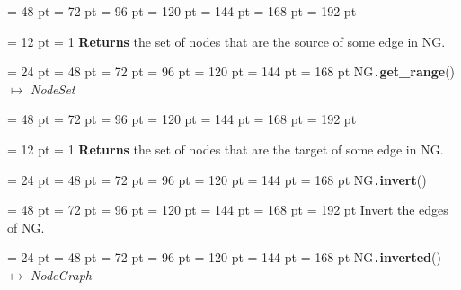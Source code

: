 {{{{\par \noindent  \leftskip = 48 pt  \leftmargini = 72 pt  \leftmarginii = 96 pt  \leftmarginiii = 120 pt  \leftmarginiv = 144 pt  \leftmarginv = 168 pt  \leftmarginvi = 192 pt {\par \noindent
{\par \pagebreak[3.100000] \noindent \hangindent = 12 pt \hangafter = 1 
{\bf Returns \/} the set of nodes that are the source of some edge in NG.
\par}
\par}
\par}
\par}
\par}
{\par \noindent  \leftskip = 24 pt  \leftmargini = 48 pt  \leftmarginii = 72 pt  \leftmarginiii = 96 pt  \leftmarginiv = 120 pt  \leftmarginv = 144 pt  \leftmarginvi = 168 pt NG{\tt .\/}{\bf {\large {\bf get{\_}range\/}}\/}() \(\mapsto \)  {\em NodeSet\/}{\par \noindent
{\par \noindent  \leftskip = 48 pt  \leftmargini = 72 pt  \leftmarginii = 96 pt  \leftmarginiii = 120 pt  \leftmarginiv = 144 pt  \leftmarginv = 168 pt  \leftmarginvi = 192 pt {\par \noindent
{\par \pagebreak[3.100000] \noindent \hangindent = 12 pt \hangafter = 1 
{\bf Returns \/} the set of nodes that are the target of some edge in NG.
\par}
\par}
\par}
\par}
\par}
{\par \noindent  \leftskip = 24 pt  \leftmargini = 48 pt  \leftmarginii = 72 pt  \leftmarginiii = 96 pt  \leftmarginiv = 120 pt  \leftmarginv = 144 pt  \leftmarginvi = 168 pt NG{\tt .\/}{\bf {\large {\bf invert\/}}\/}(){\par \noindent
{\par \noindent  \leftskip = 48 pt  \leftmargini = 72 pt  \leftmarginii = 96 pt  \leftmarginiii = 120 pt  \leftmarginiv = 144 pt  \leftmarginv = 168 pt  \leftmarginvi = 192 pt  Invert the edges of NG.
\par}
\par}
\par}
{\par \noindent  \leftskip = 24 pt  \leftmargini = 48 pt  \leftmarginii = 72 pt  \leftmarginiii = 96 pt  \leftmarginiv = 120 pt  \leftmarginv = 144 pt  \leftmarginvi = 168 pt NG{\tt .\/}{\bf {\large {\bf inverted\/}}\/}() \(\mapsto \)  {\em NodeGraph\/}{\par \noindent
}}}
